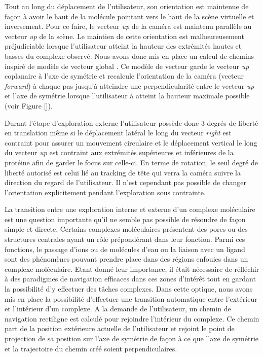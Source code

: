 Tout au long du déplacement de l'utilisateur, son orientation est maintenue de façon à avoir le haut de la molécule pointant vers le haut de la scène virtuelle et inversement. Pour ce faire, le vecteur \textit{up} de la caméra est maintenu parallèle au vecteur \textit{up} de la scène. Le maintien de cette orientation est malheureusement préjudiciable lorsque l'utilisateur atteint la hauteur des extrémités hautes et basses du complexe observé. Nous avons donc mis en place un calcul de chemins inspiré de modèle de vecteur global \cite{khan_hovercam:_2005}. Ce modèle de vecteur garde le vecteur \textit{up} coplanaire à l'axe de symétrie et recalcule l'orientation de la caméra (vecteur \textit{forward}) à chaque pas jusqu'à atteindre une perpendicularité entre le vecteur \textit{up} et l'axe de symétrie lorsque l'utilisateur à atteint la hauteur maximale possible (voir Figure \ref{}).

Durant l'étape d'exploration externe l'utilisateur possède donc 3 degrés de liberté en translation même si le déplacement latéral le long du vecteur \textit{right} est contraint pour assurer un mouvement circulaire et le déplacement vertical le long du vecteur \textit{up} est contraint aux extrémités supérieures et inférieures de la protéine afin de garder le focus sur celle-ci. En terme de rotation, le seul degré de liberté autorisé est celui lié au tracking de tête qui verra la caméra suivre la direction du regard de l'utilisateur. Il n'est cependant pas possible de changer l'orientation explicitement pendant l'exploration sous contrainte.

La transition entre une exploration interne et externe d'un complexe moléculaire est une question importante qu'il ne semble pas possible de résoudre de façon simple et directe. Certains complexes moléculaires présentent des pores ou des structures centrales ayant un rôle prépondérant dans leur fonction. Parmi ces fonctions, le passage d'ions ou de molécules d'eau ou la liaison avec un ligand sont des phénomènes pouvant prendre place dans des régions enfouies dans un complexe moléculaire. Etant donné leur importance, il était nécessaire de réfléchir à des paradigmes de navigation efficaces dans ces zones d'intérêt tout en gardant la possibilité d'y effectuer des tâches complexes. Dans cette optique, nous avons mis en place la possibilité d'effectuer une transition automatique entre l'extérieur et l'intérieur d'un complexe. A la demande de l'utilisateur, un chemin de navigation rectiligne est calculé pour rejoindre l'intérieur du complexe. Ce chemin part de la position extérieure actuelle de l'utilisateur et rejoint le point de projection de sa position sur l'axe de symétrie de façon à ce que l'axe de symétrie et la trajectoire du chemin créé soient perpendiculaires. 

